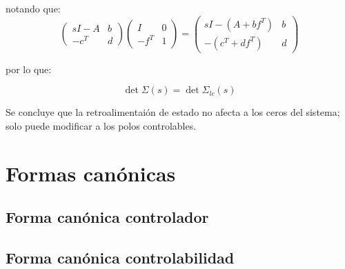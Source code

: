 \begin{enumerate}
            notando que:
            \begin{equation*}
                \begin{pmatrix}
                    sI - A & b \\
                    -c^T & d
                \end{pmatrix}
                \begin{pmatrix}
                    I & 0 \\
                    -f^T & 1
                \end{pmatrix} =
                \begin{pmatrix}
                    sI - (A + b f^T) & b \\
                    -(c^T + d f^T) & d
                \end{pmatrix}
            \end{equation*}

            por lo que:

            \begin{equation}
                \det{\Sigma(s)} = \det{\Sigma_{lc}(s)}
            \end{equation}

            Se concluye que la retroalimentaión de estado no afecta a los ceros del sistema; solo puede modificar a los polos controlables.
        \end{enumerate}

    \section{Formas canónicas}
        \subsection{Forma canónica controlador}
        \subsection{Forma canónica controlabilidad}
